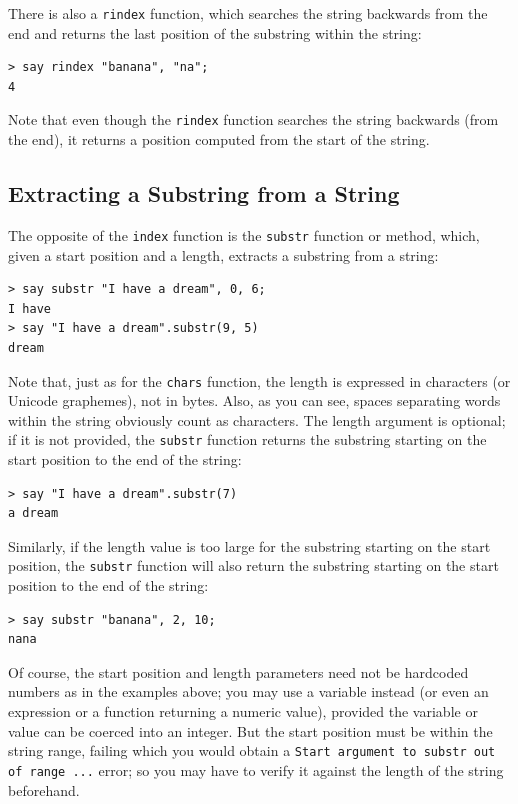 There is also a {\tt rindex} function, which searches the string 
backwards from the end and returns the last position of the 
substring within the string:

\begin{verbatim}
> say rindex "banana", "na";
4
\end{verbatim}
%

Note that even though the {\tt rindex} function searches the 
string backwards (from the end), it returns a position 
computed from the start of the string.

\subsection{Extracting a Substring from a String}

The opposite of the {\tt index} function is the {\tt substr} 
function or method, which, given a start position and a length, 
extracts a substring from a string:

\begin{verbatim}
> say substr "I have a dream", 0, 6;
I have
> say "I have a dream".substr(9, 5)
dream
\end{verbatim}
%

Note that, just as for the {\tt chars} function, the length 
is expressed in characters (or Unicode graphemes), not in bytes. 
Also, as you can see, spaces separating words within the string 
obviously count as characters. The length argument is optional; 
if it is not provided, the {\tt substr} function returns the 
substring starting on the start position to the end of the string:

\begin{verbatim}
> say "I have a dream".substr(7)
a dream
\end{verbatim}

Similarly, if the length value is too large for the 
substring starting on the start position, the {\tt substr} 
function will also return the substring starting on the start 
position to the end of the string:

\begin{verbatim}
> say substr "banana", 2, 10;
nana
\end{verbatim}

Of course, the start position and length parameters need not be 
hardcoded numbers as in the examples above; you may use a variable 
instead (or even an expression or a function returning a numeric 
value), provided the variable or value can be coerced into an integer. 
But the start position must be within the string range, 
failing which you would obtain a {\tt Start argument to 
substr out of range ...} error; so you may have to verify it 
against the length of the string beforehand. 

